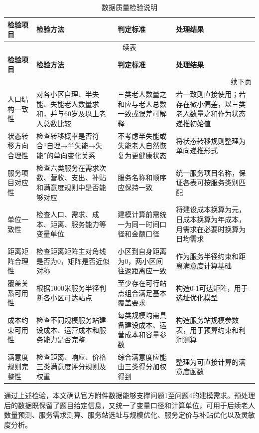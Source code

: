 \documentclass[UTF8]{ctexart}
\begin{document}
\begin{longtable}{|p{2.5cm}|p{4cm}|p{3cm}|p{3cm}|}
\caption{数据质量检验说明}
\label{tab:data_quality}\\
\hline
\textbf{检验项目} & \textbf{检验方法} & \textbf{判定标准} & \textbf{处理结果} \\
\hline
\endfirsthead

\multicolumn{4}{c}{续表} \\
\hline
\textbf{检验项目} & \textbf{检验方法} & \textbf{判定标准} & \textbf{处理结果} \\
\hline
\endhead

\hline
\multicolumn{4}{r}{{续下页}} \\
\endfoot

\hline
\endlastfoot

人口结构一致性 & 对各小区自理、半失能、失能老人数量求和，并与60岁及以上老人总数比较 & 三类老人数量之和应与老人总数一致或误差可解释 & 若一致则直接使用；若存在微小偏差，以三类老人数量之和作为状态递推初始值 \\
\hline
状态转移方向合理性 & 检查转移概率是否符合“自理→半失能→失能”的单向变化关系 & 不考虑半失能或失能老人自然恢复为更健康状态 & 将状态转移规则整理为单向递推形式 \\
\hline
服务项目对应性 & 检查六类服务在需求次数、营收、支出、补贴和满意度规则中是否能够对应 & 服务名称和顺序应保持一致 & 统一服务项目名称，保证各表可按服务类别匹配 \\
\hline
单位一致性 & 检查人口、需求、成本、距离、服务能力等变量单位 & 建模计算前需统一为同一时间口径和金额口径 & 将建设成本换算为元，日成本换算为年成本，月需求在必要时换算为日均需求 \\
\hline
距离矩阵合理性 & 检查距离矩阵主对角线是否为0，矩阵是否近似对称 & 小区到自身距离为0，两小区间往返距离应一致 & 作为服务半径约束和距离满意度计算基础 \\
\hline
覆盖关系可用性 & 根据1000米服务半径判断各小区可达站点 & 至少存在可行站点组合满足基本覆盖要求 & 构造0-1可达矩阵，用于选址优化模型 \\
\hline
成本约束可用性 & 检查不同规模服务站建设成本、运营成本和服务能力是否完整 & 每类规模均需具备建设成本、运营成本和容量参数 & 构造服务站规模参数表，用于预算约束和利润测算 \\
\hline
满意度规则完整性 & 检查距离、响应、价格三类满意度评分规则及权重 & 综合满意度应能由三类得分加权得到 & 整理为可直接计算的满意度函数 \\
\hline
\end{longtable}

通过上述检验，本文确认官方附件数据能够支撑问题1至问题4的建模需求。预处理后的数据既保留了题目给定信息，又统一了变量口径和计算单位，可用于后续老人数量预测、服务需求测算、服务站选址与规模优化、服务定价与补贴优化以及灵敏度分析。
\end{document}
